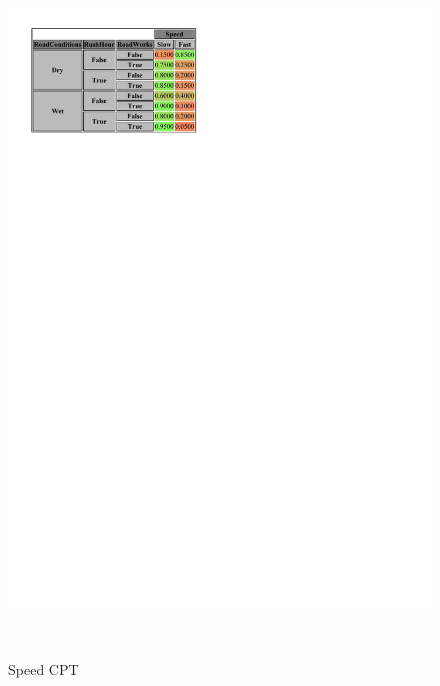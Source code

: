 \documentclass[a4paper,12pt]{article} %
\begin{document}
\begin{figure}[H]
\begin{center}
	\begin{minipage}[c]{.5\textwidth}
		\centering
		\includegraphics[width=\linewidth]{../code/speed.pdf}	
		\caption*{Speed CPT}
		\label{fig:speed}
	\end{minipage}
	~
	\begin{minipage}[c]{.45\textwidth}
		\centering

\end{minipage}
\end{center}
\end{figure}
\end{document}
